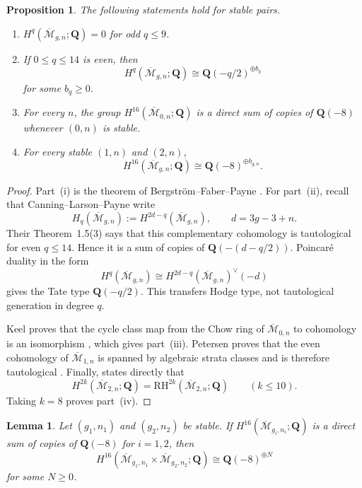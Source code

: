 \documentclass[12pt,reqno]{amsart}
\newcommand{\Q}{\mathbf{Q}}
\newcommand{\Mbar}{\overline{\mathcal{M}}}
\newcommand{\RH}{\mathrm{RH}}
\newtheorem{proposition}[theorem]{Proposition}
\newtheorem{lemma}[theorem]{Lemma}
\theoremstyle{definition}
\theoremstyle{remark}
\begin{document}
\begin{proposition}\label{prop:compact-inputs}
The following statements hold for stable pairs.
\begin{enumerate}[label=\textup{(\roman*)}]
\item $H^q(\Mbar_{g,n};\Q)=0$ for odd $q\leq9$.
\item If $0\leq q\leq14$ is even, then
\[
 H^q(\Mbar_{g,n};\Q)\cong\Q(-q/2)^{\oplus b_q}
\]
for some $b_q\geq0$.
\item For every $n$, the group $H^{16}(\Mbar_{0,n};\Q)$ is a direct sum of
copies of $\Q(-8)$ whenever $(0,n)$ is stable.
\item For every stable $(1,n)$ and $(2,n)$,
\[
 H^{16}(\Mbar_{g,n};\Q)\cong\Q(-8)^{\oplus b_{g,n}}.
\]
\end{enumerate}
\end{proposition}

\begin{proof}
Part~(i) is the theorem of Bergstr\"om--Faber--Payne
\cite[Theorem~1.1]{BFP}.  For part~(ii), recall that
Canning--Larson--Payne write
\[
 H_q(\Mbar_{g,n}):=H^{2d-q}(\Mbar_{g,n}),
 \qquad d=3g-3+n.
\]
Their Theorem~1.5(3) says that this complementary cohomology is
tautological for even $q\leq14$.  Hence it is a sum of copies of
$\Q(-(d-q/2))$.  Poincar\'e duality in the form
\[
 H^q(\Mbar_{g,n})
 \cong H^{2d-q}(\Mbar_{g,n})^\vee(-d)
\]
gives the Tate type $\Q(-q/2)$.  This transfers Hodge type, not
tautological generation in degree $q$.

Keel proves that the cycle class map from the Chow ring of
$\Mbar_{0,n}$ to cohomology is an isomorphism \cite{Keel}, which gives
part~(iii).  Petersen proves that the even cohomology of
$\Mbar_{1,n}$ is spanned by algebraic strata classes and is therefore
tautological \cite[Corollary~1.2]{PetersenGenusOne}.
Finally, \cite[Corollary~2.7]{CLP} states directly that
\[
 H^{2k}(\Mbar_{2,n};\Q)=\RH^{2k}(\Mbar_{2,n};\Q)
 \qquad(k\leq10).
\]
Taking $k=8$ proves part~(iv).
\end{proof}

\begin{lemma}\label{lem:kunneth}
Let $(g_1,n_1)$ and $(g_2,n_2)$ be stable.  If
$H^{16}(\Mbar_{g_i,n_i};\Q)$ is a direct sum of copies of $\Q(-8)$ for
$i=1,2$, then
\begin{equation}\label{eq:kunneth}
 H^{16}(\Mbar_{g_1,n_1}\times\Mbar_{g_2,n_2};\Q)
 \cong\Q(-8)^{\oplus N}
\end{equation}
for some $N\geq0$.
\end{lemma}
\end{document}
